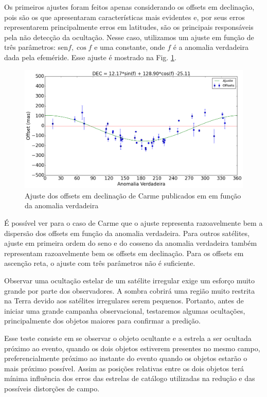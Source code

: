 \documentclass[12pt,a4paper]{monografia}
\begin{document}
Os primeiros ajustes foram feitos apenas considerando os offsets em declinação, pois são os que apresentaram características mais evidentes e, por seus erros representarem principalmente erros em latitudes, são os principais responsáveis pela não detecção da ocultação. Nesse caso, utilizamos um ajuste em função de três parâmetros: sen${f}, \cos{f}$ e uma constante, onde $f$ é a anomalia verdadeira dada pela efeméride. Esse ajuste é mostrado na Fig. \ref{Fig: Carme-dec-fit}.

\begin{figure}
\begin{centering}
\includegraphics[scale=0.45]{figuras/Carme-DEC_fit.png} 
\caption{Ajuste dos offsets em declinação de Carme publicados em \cite{GomesJunior2015-Irregular} em função da anomalia verdadeira}
\label{Fig: Carme-dec-fit}
\end{centering}
\end{figure}

É possível ver para o caso de Carme que o ajuste representa razoavelmente bem a dispersão dos offsets em função da anomalia verdadeira. Para outros satélites, ajuste em primeira ordem do seno e do cosseno da anomalia verdadeira também representam razoavelmente bem os offsets em declinação. Para os offsets em ascenção reta, o ajuste com três parâmetros não é suficiente.

Observar uma ocultação estelar de um satélite irregular exige um esforço muito grande por parte dos observadores. A sombra cobrirá uma região muito restrita na Terra devido aos satélites irregulares serem pequenos. Portanto, antes de iniciar uma grande campanha observacional, testaremos algumas ocultações, principalmente dos objetos maiores para confirmar a predição.

Esse teste consiste em se observar o objeto ocultante e a estrela a ser ocultada próximo ao evento, quando os dois objetos estiverem presentes no mesmo campo, preferencialmente próximo ao instante do evento quando os objetos estarão o mais próximo possível. Assim as posições relativas entre os dois objetos terá mínima influência dos erros das estrelas de catálogo utilizadas na redução e das possíveis distorções de campo.
\end{document}
